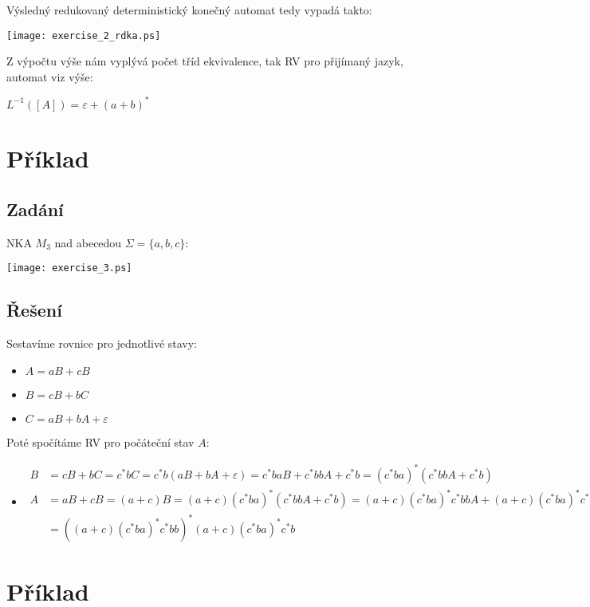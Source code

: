 \documentclass[11pt, a4paper]{article}
\begin{document}
\noindent Výsledný redukovaný deterministický konečný automat tedy vypadá takto:
\begin{center}
	\texttt{[image: exercise\_2\_rdka.ps]}
\end{center}

\noindent Z výpočtu výše nám vyplývá počet tříd ekvivalence, tak RV pro přijímaný jazyk, automat viz výše:

$L^{-1}([A]) = \varepsilon + (a + b)^*$

\section{Příklad}
\subsection*{Zadání}
NKA $M_3$ nad abecedou $ \Sigma = \{a, b, c\} $:
\begin{center}
	\texttt{[image: exercise\_3.ps]}
\end{center}

\subsection*{Řešení}
Sestavíme rovnice pro jednotlivé stavy:
\begin{itemize}[label={},noitemsep]
	\item $ A = aB + cB $
	\item $ B = cB + bC $
	\item $ C = aB + bA + \varepsilon $
\end{itemize}
Poté spočítáme RV pro počáteční stav $A$:
\begin{itemize}[label={},noitemsep]
	\item $\begin{aligned} B &= cB + bC = c^*bC = c^*b(aB + bA + \varepsilon) = c^*baB + c^*bbA + c^*b = (c^*ba)^*(c^*bbA + c^*b)
	      \\ A &= aB + cB = (a + c)B = (a + c)(c^*ba)^*(c^*bbA + c^*b) =
	      (a + c)(c^*ba)^*c^*bbA + (a + c)(c^*ba)^*c^*b \\&= ((a + c)(c^*ba)^*c^*bb)^*
	      (a + c)(c^*ba)^*c^*b \end{aligned}$
\end{itemize}

\section{Příklad}
\end{document}
